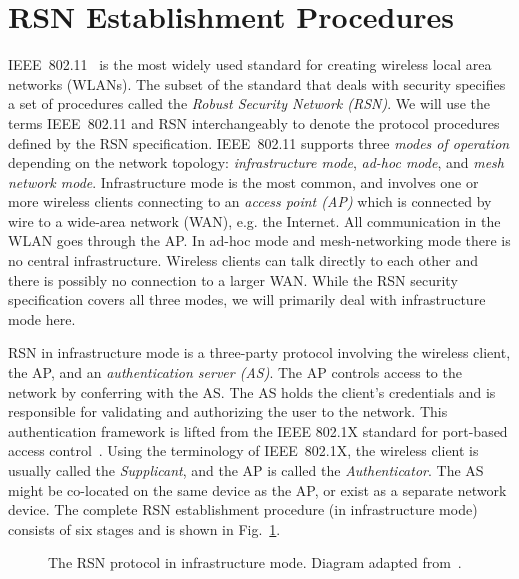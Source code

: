 \section{RSN Establishment Procedures}
IEEE~802.11~\cite{IEEE:2012:802.11} is the most widely used standard for creating wireless local area networks (WLANs).
The subset of the standard that deals with security specifies a set of procedures called the \emph{Robust Security Network (RSN)}.
We will use the terms IEEE~802.11 and RSN interchangeably to denote the protocol procedures defined by the RSN specification.
IEEE~802.11 supports three \emph{modes of operation}
depending on the network topology: \emph{infrastructure mode},
\emph{ad-hoc mode},
and \emph{mesh network mode}.
Infrastructure mode is the most common,
and involves one or more wireless clients connecting to an \emph{access point (AP)} which is connected by wire to a wide-area network (WAN), e.g. the Internet.
All communication in the WLAN goes through the AP. 
In ad-hoc mode and mesh-networking mode there is no central infrastructure.
Wireless clients can talk directly to each other and there is possibly no connection to a larger WAN.
While the RSN security specification covers all three modes,
we will primarily deal with infrastructure mode here.

RSN in infrastructure mode is a three-party protocol involving the wireless client,
the AP,
and an \emph{authentication server (AS)}.
The AP controls access to the network by conferring with the AS.
The AS holds the client's credentials and is responsible for validating and authorizing the user to the network.
This authentication framework is lifted from the IEEE 802.1X standard for port-based access control~\cite{IEEE:2010:802.1X}. 
Using the terminology of IEEE~802.1X,
the wireless client is usually called the \emph{Supplicant},
and the AP is called the \emph{Authenticator}.
The AS might be co-located on the same device as the AP,
or exist as a separate network device.
The complete RSN establishment procedure (in infrastructure mode) consists of six stages and is shown in Fig.~\ref{fig:RSN_establishment}. 

\begin{figure}
	\centerline{}
	\caption{The RSN protocol in infrastructure mode. 
	Diagram adapted from~\cite{He:05:securityanalysis80211}.}
	\label{fig:RSN_establishment}
\end{figure}




